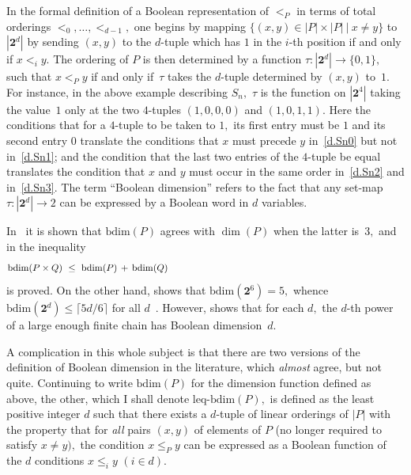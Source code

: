 \documentclass{amsart}
\numberwithin{equation}{section}
\numberwithin{theorem}{section}
\renewcommand{\r}{\mathrm}
\newcommand{\2}{\mathbf{2}}
\begin{document}
In the formal definition of a Boolean representation
of $<_P$ in terms of total orderings $<_0,\dots,<_{d-1},$
one begins by mapping $\{(x,y)\in|P|\times |P|\ |\ x\neq y\}$
to $|\2^d|$ by sending $(x,y)$ to the $\!d\!$-tuple which
has $1$ in the $\!i\!$-th position if and only if $x<_i y.$
The ordering of $P$ is then
determined by a function $\tau: |\2^d|\to\{0,1\},$
such that $x<_P y$ if and only if~$\tau$
takes the $\!d\!$-tuple determined by $(x,y)$ to~$1.$
For instance, in the above example describing $S_n,$ $\tau$ is
the function on $|\2^4|$ taking the value~$1$ only
at the two $\!4\!$-tuples $(1,0,0,0)$ and $(1,0,1,1).$
Here the conditions that for a $\!4\!$-tuple to be taken to $1,$
its first entry must be $1$ and its second entry $0$
translate the conditions that
$x$ must precede $y$ in~\eqref{d.Sn0} but not in~\eqref{d.Sn1};
and the condition that the last two entries of the $\!4\!$-tuple
be equal translates the condition that $x$ and $y$ must occur
in the same order in~\eqref{d.Sn2} and in~\eqref{d.Sn3}.
The term ``Boolean dimension'' refers to the fact that any set-map
$\tau: |\2^d|\to 2$ can be expressed by a Boolean word
in $d$ variables.

In~\cite{T+W} it is shown that $\r{bdim}(P)$ agrees with $\dim(P)$
when the latter is~$3,$ and in \cite[Lemma~4]{5/6} the inequality
%
\begin{equation}\begin{minipage}[c]{35pc}\label{d.bdim_prod}
$\r{bdim}(P\times Q)\ \leq\ \r{bdim}(P)\,+\,\r{bdim}(Q)$
\end{minipage}\end{equation}
%
is proved.
On the other hand, \mbox{\cite[Lemma~6]{5/6}} shows that
$\r{bdim}(\2^6)=5,$ whence $\r{bdim}(\2^d)\leq\lceil 5d/6\rceil$ for
all $d$~\cite[Theorem~5]{5/6}.
However, \mbox{\cite[Proposition~9]{5/6}} shows that
for each $d,$ the $\!d\!$-th power of a large enough
finite chain has Boolean dimension~$d.$

A complication in this whole subject
is that there are two versions of the definition
of Boolean dimension in the literature, which {\em almost}
agree, but not quite.
Continuing to write $\r{bdim}(P)$ for the dimension function
defined as above, the other, which I
shall denote $\r{leq}\!$-$\!\r{bdim}(P),$
is defined as the least positive integer $d$ such that there exists
a $\!d\!$-tuple of linear orderings of $|P|$ with the property that
for {\em all} pairs $(x,y)$ of elements of $P$ (no longer required to
satisfy $x\neq y),$ the condition $x\leq_P y$ can be expressed as a
Boolean function of the $d$ conditions $x\leq_i y$ $(i\in d).$
\end{document}
